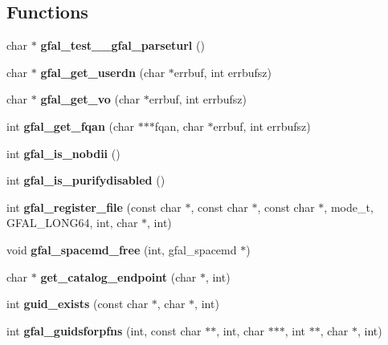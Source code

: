 \subsection*{Functions}
\begin{CompactItemize}
\item 
char $\ast$ \textbf{gfal\_\-test\_\-\_\-gfal\_\-parseturl} ()\label{group__internal__group_g9282bb70dffe20af2db91d05418ac9c5}

\item 
char $\ast$ \textbf{gfal\_\-get\_\-userdn} (char $\ast$errbuf, int errbufsz)\label{group__internal__group_g6bd6336b0fee1ff32ad6bc5ef3d96068}

\item 
char $\ast$ \textbf{gfal\_\-get\_\-vo} (char $\ast$errbuf, int errbufsz)\label{group__internal__group_g1d7294ee456d16c8b1bf40f97ffb5081}

\item 
int \textbf{gfal\_\-get\_\-fqan} (char $\ast$$\ast$$\ast$fqan, char $\ast$errbuf, int errbufsz)\label{group__internal__group_g54b4e29078838583c8022630ef5a2ed3}

\item 
int \textbf{gfal\_\-is\_\-nobdii} ()\label{group__internal__group_g0d2a0557bdb571ccb85c6ab5c05ae56f}

\item 
int \textbf{gfal\_\-is\_\-purifydisabled} ()\label{group__internal__group_g3a35f0e6f616c5108f95cfffd557db77}

\item 
int \textbf{gfal\_\-register\_\-file} (const char $\ast$, const char $\ast$, const char $\ast$, mode\_\-t, GFAL\_\-LONG64, int, char $\ast$, int)\label{group__internal__group_gdb09f20d086253b45c5d2896be95b4a9}

\item 
void \textbf{gfal\_\-spacemd\_\-free} (int, gfal\_\-spacemd $\ast$)\label{group__internal__group_gb22308fb1cfbade81dddfcf4bedf86da}

\item 
char $\ast$ \textbf{get\_\-catalog\_\-endpoint} (char $\ast$, int)\label{group__internal__group_gb3b834ff96e3d42df0404a02a9f8d1f5}

\item 
int \textbf{guid\_\-exists} (const char $\ast$, char $\ast$, int)\label{group__internal__group_g7aea3a7b0803552b8f2a441f57d900a3}

\item 
int \textbf{gfal\_\-guidsforpfns} (int, const char $\ast$$\ast$, int, char $\ast$$\ast$$\ast$, int $\ast$$\ast$, char $\ast$, int)\label{group__internal__group_g72f2d9fb6a55816f243a4c57c5369fe5}


\end{CompactItemize}
